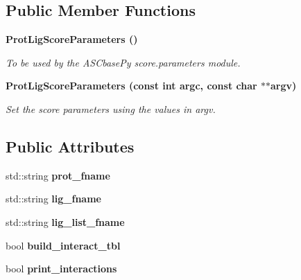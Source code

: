 \subsection*{Public Member Functions}
\begin{CompactItemize}
\item 
\bf{Prot\-Lig\-Score\-Parameters} ()\label{classASCbase_1_1ProtLigScoreParameters_1d7c25c9061b1997ec8774cab0fe6ce5}

\begin{CompactList}\small\item\em To be used by the ASCbase\-Py score.parameters module. \item\end{CompactList}\item 
\bf{Prot\-Lig\-Score\-Parameters} (const int argc, const char $\ast$$\ast$argv)\label{classASCbase_1_1ProtLigScoreParameters_f8279eb37256fd5b6433900ac1ca8cab}

\begin{CompactList}\small\item\em Set the score parameters using the values in argv. \item\end{CompactList}\end{CompactItemize}
\subsection*{Public Attributes}
\begin{CompactItemize}
\item 
std::string \textbf{prot\_\-fname}\label{classASCbase_1_1ProtLigScoreParameters_d73e199c8788c4f367b7c0a246e00223}

\item 
std::string \textbf{lig\_\-fname}\label{classASCbase_1_1ProtLigScoreParameters_c6f884bad30d7e98f0fb5245dbd4d93e}

\item 
std::string \textbf{lig\_\-list\_\-fname}\label{classASCbase_1_1ProtLigScoreParameters_98f587548a6a1561b9291bfc778d5085}

\item 
bool \textbf{build\_\-interact\_\-tbl}\label{classASCbase_1_1ProtLigScoreParameters_20387a9ca9a836688d34d4e68c009632}

\item 
bool \textbf{print\_\-interactions}\label{classASCbase_1_1ProtLigScoreParameters_6d07515b95e1a858c129c8d2e6e1b5ea}

\end{CompactItemize}
